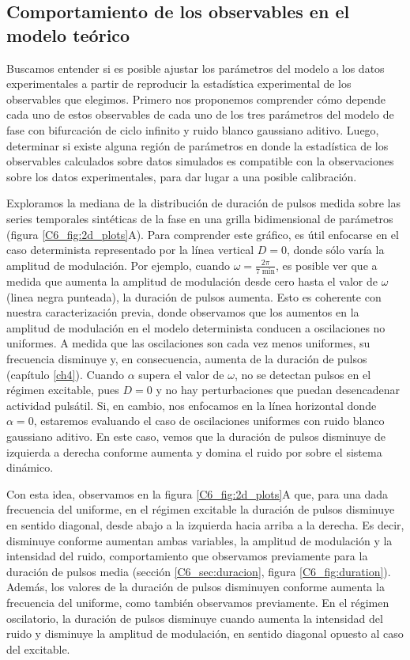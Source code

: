 \documentclass[./main.tex]{subfiles}
\begin{document}
\subsection{Comportamiento de los observables en el modelo teórico}

Buscamos entender si es posible ajustar los parámetros del modelo a los datos experimentales a partir de reproducir la estadística experimental de los observables que elegimos. Primero nos proponemos comprender cómo depende cada uno de estos observables de cada uno de los tres parámetros del modelo de fase con bifurcación de ciclo infinito y ruido blanco gaussiano aditivo. Luego, determinar si existe alguna región de parámetros en donde la estadística de los observables calculados sobre datos simulados es compatible con la observaciones sobre los datos experimentales, para dar lugar a una posible calibración. 

Exploramos la mediana de la distribución de duración de pulsos medida sobre las series temporales sintéticas de la fase en una grilla bidimensional de parámetros (figura \ref{C6_fig:2d_plots}A). Para comprender este gráfico, es útil enfocarse en el caso determinista representado por la línea vertical $D=0$, donde sólo varía la amplitud de modulación. Por ejemplo, cuando $\omega = \frac{2\pi}{7\; \text{min}}$, es posible ver que a medida que aumenta la amplitud de modulación desde cero hasta el valor de $\omega$ (linea negra punteada), la duración de pulsos aumenta. Esto es coherente con nuestra caracterización previa, donde observamos que los aumentos en la amplitud de modulación en el modelo determinista conducen a oscilaciones no uniformes. A medida que las oscilaciones son cada vez menos uniformes, su frecuencia disminuye y, en consecuencia, aumenta de la duración de pulsos (capítulo \ref{ch4}). Cuando $\alpha$ supera el valor de $\omega$, no se detectan pulsos en el régimen excitable, pues $D=0$ y no hay perturbaciones que puedan desencadenar actividad pulsátil. Si, en cambio, nos enfocamos en la línea horizontal donde $\alpha=0$, estaremos evaluando el caso de oscilaciones uniformes con ruido blanco gaussiano aditivo. En este caso, vemos que la duración de pulsos disminuye de izquierda a derecha conforme aumenta y domina el ruido por sobre el sistema dinámico.  


Con esta idea, observamos  en la figura \ref{C6_fig:2d_plots}A que, para una dada frecuencia del uniforme, en el régimen excitable la duración de pulsos disminuye en sentido diagonal, desde abajo a la izquierda hacia arriba a la derecha. Es decir, disminuye conforme aumentan ambas variables, la amplitud de modulación y la intensidad del ruido, comportamiento que observamos previamente para la duración de pulsos media (sección \ref{C6_sec:duracion}, figura \ref{C6_fig:duration}). Además, los valores de la duración de pulsos disminuyen conforme aumenta la frecuencia del uniforme, como también observamos previamente. En el régimen oscilatorio, la duración de pulsos disminuye cuando aumenta la intensidad del ruido y disminuye la amplitud de modulación, en sentido diagonal opuesto al caso del excitable. 
\end{document}
